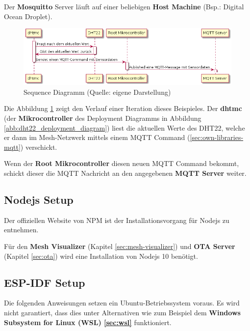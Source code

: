 Der \textbf{Mosquitto} Server läuft auf einer beliebigen \textbf{Host Machine} (Bsp.: Digital Ocean Droplet).

\vspace*{50px}
\begin{figure}[H]
    \begin{center}
        \includegraphics[scale=.5]{diagrams/mqtt_dht22_example_sequence.png}
        \caption{Sequence Diagramm (Quelle: eigene Darstellung)}
        \label{abb:dht22_sequence_diagram}
    \end{center}
\end{figure}
\vspace*{50px}

Die Abbildung \ref{abb:dht22_sequence_diagram} zeigt den Verlauf einer Iteration dieses Beispieles.
Der \textbf{dhtmc} (der \textbf{Mikrocontroller} des Deployment Diagramms in Abbildung \ref{abb:dht22_deployment_diagram}) liest die aktuellen Werte des DHT22, welche er dann im Mesh-Netzwerk mittels einem MQTT Command (\ref{sec:own-libraries-mqtt}) verschickt.

Wenn der \textbf{Root Mikrocontroller} diesen neuen MQTT Command bekommt, schickt dieser die MQTT Nachricht an den angegebenen \textbf{MQTT Server} weiter.

\subsection{Nodejs Setup}

Der offiziellen Website von NPM \cite{nodejs-install} ist der Installationsvorgang für Nodejs zu entnehmen.

Für den \textbf{Mesh Visualizer} (Kapitel \ref{sec:mesh-visualizer}) und \textbf{OTA Server} (Kapitel \ref{sec:ota}) wird eine Installation von Nodejs 10 benötigt.

\subsection{ESP-IDF Setup}

Die folgenden Anweisungen setzen ein Ubuntu-Betriebssystem voraus. Es wird nicht garantiert, dass dies unter Alternativen wie zum Beispiel dem \textbf{Windows Subsystem for Linux (WSL) \ref{sec:wsl}} funktioniert. 

